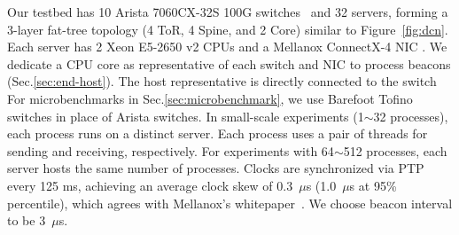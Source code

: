 Our testbed has 10 Arista 7060CX-32S 100G switches~\cite{arista} and 32 servers, forming a 3-layer fat-tree topology (4 ToR, 4 Spine, and 2 Core) similar to Figure~\ref{fig:dcn}.
Each server has 2 Xeon E5-2650 v2 CPUs and a Mellanox ConnectX-4 NIC .
We dedicate a CPU core as representative of each switch and NIC to process beacons (Sec.\ref{sec:end-host}). The host representative is directly connected to the switch
For microbenchmarks in Sec.\ref{sec:microbenchmark}, we use Barefoot Tofino~\cite{tofino} switches in place of Arista switches.
In small-scale experiments (1$\sim$32 processes), each process runs on a distinct server. Each process uses a pair of threads for sending and receiving, respectively.
For experiments with 64$\sim$512 processes, each server hosts the same number of processes.
Clocks are synchronized via PTP~\cite{correll2005design} every 125 ms, achieving an average clock skew of 0.3~$\mu$s (1.0~$\mu$s at 95\% percentile), which agrees with Mellanox's whitepaper~\cite{mellanox-ptp}.
We choose beacon interval to be 3~$\mu$s.


\iffalse
\begin{table}[t]
\centering
{}
\caption{Network topologies for evaluation.}
\label{tab:eval-topology}
\end{table}

